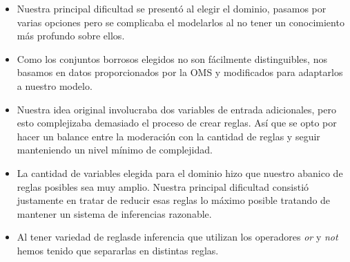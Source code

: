 \documentclass[11pt]{article}
\begin{document}
\begin{itemize}
    \item Nuestra principal dificultad se presentó al elegir el dominio, pasamos por 
          varias opciones pero se complicaba el modelarlos al no tener un conocimiento
          más profundo sobre ellos.
    \item Como los conjuntos borrosos elegidos no son fácilmente distinguibles,
          nos basamos en datos proporcionados por la OMS y modificados para 
          adaptarlos a nuestro modelo.
    \item Nuestra idea original involucraba dos variables de entrada adicionales, 
          pero esto complejizaba demasiado el proceso de crear reglas. Así que
          se opto por hacer un balance entre la moderación con la cantidad de reglas
          y seguir manteniendo un nivel mínimo de complejidad.
    \item La cantidad de variables elegida para el dominio hizo que nuestro abanico de 
          reglas posibles sea muy amplio. Nuestra principal dificultad consistió justamente 
          en tratar de reducir esas reglas lo máximo posible tratando de mantener
          un sistema de inferencias razonable.
    \item Al tener variedad de reglasde inferencia que utilizan los operadores \emph{or} y \emph{not}
          hemos tenido que separarlas en distintas reglas.
\end{itemize}
\end{document}
